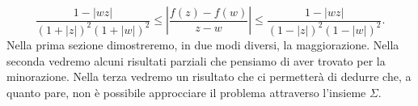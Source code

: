 \begin{equation}\label{congettura}
  \frac{1-|wz|}{(1+|z|)^2(1+|w|)^2} \le \left|\frac{f(z)-f(w)}{z-w}\right| \le \frac{1-|wz|}{(1-|z|)^2(1-|w|)^2}.
\end{equation}
Nella prima sezione dimostreremo, in due modi diversi, la maggiorazione. Nella seconda vedremo alcuni risultati parziali che pensiamo di aver trovato per la minorazione. Nella terza vedremo un risultato che ci permetterà di dedurre che, a quanto pare, non è possibile approcciare il problema attraverso l'insieme $\Sigma$.
